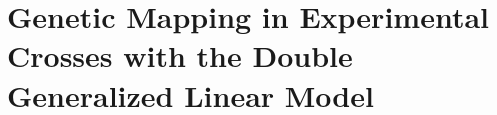 \chapter{Genetic Mapping in Experimental Crosses with the Double Generalized Linear Model}
\label{chap:exp_crosses}

\lipsum[1]